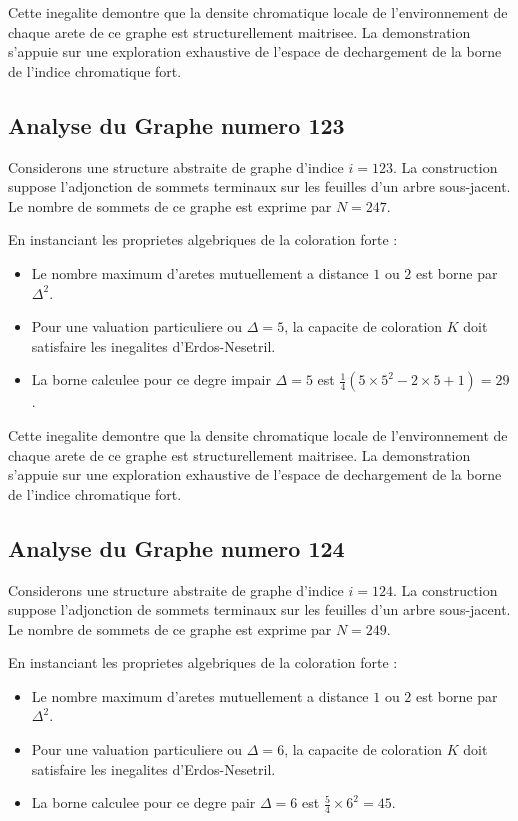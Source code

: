 \documentclass[11pt,a4paper]{article}
\begin{document}
Cette inegalite demontre que la densite chromatique locale de l'environnement de chaque arete de ce graphe est structurellement maitrisee. La demonstration s'appuie sur une exploration exhaustive de l'espace de dechargement de la borne de l'indice chromatique fort.

\subsection{Analyse du Graphe numero 123}
Considerons une structure abstraite de graphe d'indice $i = 123$. La construction suppose l'adjonction de sommets terminaux sur les feuilles d'un arbre sous-jacent. Le nombre de sommets de ce graphe est exprime par $N = 247$.

En instanciant les proprietes algebriques de la coloration forte :
\begin{itemize}
\item Le nombre maximum d'aretes mutuellement a distance $1$ ou $2$ est borne par $\Delta^2$.
\item Pour une valuation particuliere ou $\Delta = 5$, la capacite de coloration $K$ doit satisfaire les inegalites d'Erdos-Nesetril.
\item La borne calculee pour ce degre impair $\Delta = 5$ est $\frac{1}{4}(5 \times 5^2 - 2 \times 5 + 1) = 29$.
\end{itemize}

Cette inegalite demontre que la densite chromatique locale de l'environnement de chaque arete de ce graphe est structurellement maitrisee. La demonstration s'appuie sur une exploration exhaustive de l'espace de dechargement de la borne de l'indice chromatique fort.

\subsection{Analyse du Graphe numero 124}
Considerons une structure abstraite de graphe d'indice $i = 124$. La construction suppose l'adjonction de sommets terminaux sur les feuilles d'un arbre sous-jacent. Le nombre de sommets de ce graphe est exprime par $N = 249$.

En instanciant les proprietes algebriques de la coloration forte :
\begin{itemize}
\item Le nombre maximum d'aretes mutuellement a distance $1$ ou $2$ est borne par $\Delta^2$.
\item Pour une valuation particuliere ou $\Delta = 6$, la capacite de coloration $K$ doit satisfaire les inegalites d'Erdos-Nesetril.
\item La borne calculee pour ce degre pair $\Delta = 6$ est $\frac{5}{4} \times 6^2 = 45$.
\end{itemize}
\end{document}
